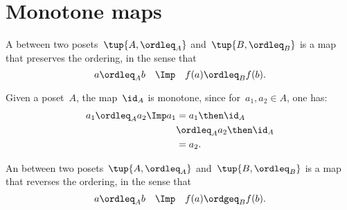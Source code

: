 

\section{Monotone maps}\label{sec:monotonicity-monotone-maps}

\begin{definition}
    \label{def:monotone}
    A \emph{} between two posets~$\tup{A, \ordleq_A}$ and~$\tup{B, \ordleq_B}$ is a map that preserves the ordering, in the sense that
    \begin{equation*}
        a \ordleq_A b \quad \Imp \quad f(a) \ordleq_B f(b).
    \end{equation*}
\end{definition}
\begin{remark}
    Given a poset~$A$, the map~$\id_A$ is monotone, since for~$a_1,a_2\in A$, one has:
    \begin{equation*}
        \begin{aligned}
            a_1\ordleq_A a_2 \Imp a_1&=a_1\then \id_A\\
            &\ordleq_A a_2\then \id_A \\
            &= a_2.
        \end{aligned}
    \end{equation*}
\end{remark}

\begin{definition}
    \label{def:antitone}
    An \emph{} between two posets~$\tup{A, \ordleq_A}$ and~$\tup{B, \ordleq_B}$ is a map that reverses the ordering, in the sense that
    \begin{equation*}
        a \ordleq_A b \quad \Imp \quad f(a) \ordgeq_B f(b).
    \end{equation*}
\end{definition}


\begin{comment}
    A monotone map is an \emph{order isomorphism} if the other direction
    of the implication holds as well:
    \begin{equation}
        a \leq_A b \quad \Leftrightarrow \quad f(a) \leq_B f(b).
    \end{equation}
\end{comment}

